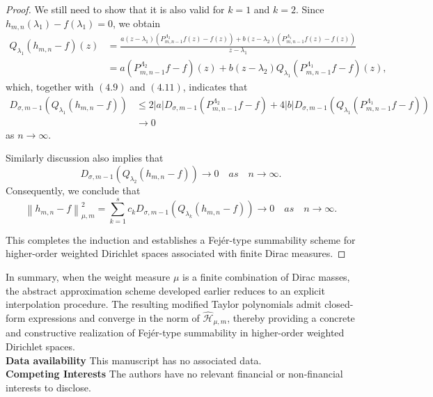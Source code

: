 \documentclass[12pt,reqno]{amsart}
\begin{document}
\begin{proof}
We still need to show that it is also valid for \( k = 1 \) and \( k = 2 \). Since ${h_{m,n}}({\lambda _1}) - f({\lambda _1}) = 0 $, we obtain
\begin{align*}
{Q_{{\lambda _1}}}({h_{m,n}} - f)(z) &= \frac{{a(z - {\lambda _1})(P_{m,n - 1}^{{\Lambda _2}}f(z) - f(z)) + b(z - {\lambda _2})(P_{m,n - 1}^{{\Lambda _1}}f(z) - f(z))}}{{z - {\lambda _1}}}\\
                                   &=a(P_{m,n - 1}^{{\Lambda _2}}f - f)(z) + b(z - {\lambda _2}){Q_{{\lambda _1}}}(P_{m,n - 1}^{{\Lambda _1}}f - f)(z),
\end{align*}
which, together with \((4.9)\) and \((4.11)\), indicates that
\begin{align*}
{D_{\sigma ,m - 1}}({Q_{{\lambda _1}}}({h_{m,n}} - f)) &\le 2\left| a \right|{D_{\sigma ,m - 1}}(P_{m,n - 1}^{{\Lambda _2}}f - f) + 4\left| b \right|{D_{\sigma ,m - 1}}({Q_{{\lambda _1}}}(P_{m,n - 1}^{{\Lambda _1}}f - f))\\
&\to 0
\end{align*}
as $ n \to \infty $.

Similarly discussion also implies that
\[{D_{\sigma ,m - 1}}({Q_{{\lambda _2}}}({h_{m,n}} - f)) \to 0 \quad as \quad n \to \infty .\]
Consequently, we conclude that
\[\left\| {{h_{m,n}} - f} \right\|_{\mu ,m}^2 = \sum\limits_{k = 1}^s {{c_k}{D_{\sigma ,m - 1}}({Q_{{\lambda _k}}}({h_{m,n}} - f))}  \to 0 \quad as \quad n \to \infty .\]

This completes the induction and establishes a Fej\'er-type summability
scheme for higher-order weighted Dirichlet spaces associated with
finite Dirac measures.

\end{proof}

In summary, when the weight measure $\mu$ is a finite combination of Dirac masses,
the abstract approximation scheme developed earlier reduces to an explicit interpolation procedure.
The resulting modified Taylor polynomials admit closed-form expressions and converge
in the norm of $\widehat{\mathcal{H}}_{\mu,m}$, thereby providing a concrete and constructive realization
of Fej\'er-type summability in higher-order weighted Dirichlet spaces.
\\


\textbf{Data availability} This manuscript has no associated data.
	\\
	
	\textbf{Competing Interests} The authors have no relevant financial or non-financial interests to disclose.
\end{document}
